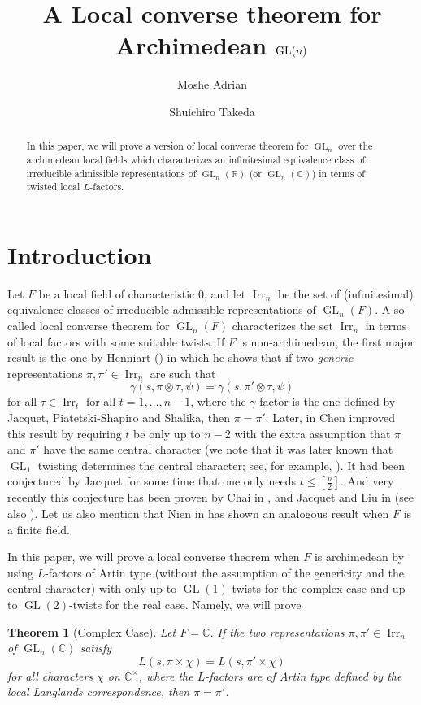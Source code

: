 \documentclass[11pt]{amsart}
\title[Archimedean local converse theorem]{A Local converse theorem
  for Archimedean $\GL(n)$}
\author{Moshe Adrian}
\author{Shuichiro Takeda}
\theoremstyle{plain}
\newtheorem*{Thm*}{Theorem}
\theoremstyle{definition}
\numberwithin{equation}{section}
\newcommand{\C}{\mathbb C}
\newcommand{\R}{\mathbb{R}}
\newcommand{\Irr}{\operatorname{Irr}}
\newcommand{\GL}{\operatorname{GL}}
\begin{document}
\maketitle

\begin{abstract} 
In this paper, we will prove a version of local
converse theorem for $\GL_n$ over the archimedean local fields which
characterizes an infinitesimal equivalence class of irreducible
admissible representations of $\GL_n(\R)$ (or $\GL_n(\C)$)
in terms of twisted local $L$-factors. 
\end{abstract}



\section{Introduction}


Let $F$ be a local field of characteristic 0, and let $\Irr_n$ be the set
of (infinitesimal) equivalence classes of irreducible admissible
representations of $\GL_n(F)$. A so-called local converse theorem for
$\GL_n(F)$ characterizes the set $\Irr_n$ in terms of local factors
with some suitable twists. If $F$ is
non-archimedean, the first major result is the one by Henniart
(\cite{Henniart1}) in which he shows that if two {\it generic}
representations $\pi, \pi'\in\Irr_n$ are such that
\[
\gamma(s, \pi\otimes\tau, \psi)=\gamma(s, \pi'\otimes\tau, \psi)
\]
for all $\tau\in\Irr_t$ for all $t=1,\dots,n-1$, where the
$\gamma$-factor is the one defined by Jacquet, Piatetski-Shapiro and
Shalika, then
$\pi=\pi'$. Later, in \cite{Chen} Chen improved this result by requiring
$t$ be only up to $n-2$ with the extra assumption that $\pi$ and
$\pi'$ have the same central character (we note that it was later known that $\GL_1$ twisting determines the central character; see, for example, \cite{JNS}). It had been conjectured by
Jacquet for some time that one only needs $t\leq[\frac{n}{2}]$. And very
recently this conjecture has been proven by Chai in \cite{Chai}, and Jacquet and Liu
in \cite{JL} (see also \cite{ALSX, JNS}). Let us also mention that Nien in \cite{Nien} has shown
an analogous result when $F$ is a finite field.

In this paper, we will prove a local converse theorem when $F$ is
archimedean by using $L$-factors of Artin type (without the
assumption of the genericity and the central character) with only up
to $\GL(1)$-twists for the complex case and up to $\GL(2)$-twists for the
real case. Namely, we will prove
\begin{Thm*}[Complex Case]
Let $F=\C$. If the two representations  $\pi, \pi'\in\Irr_n$ of
$\GL_n(\C)$ satisfy
\[
L(s, \pi\times\chi)=L(s, \pi'\times\chi)
\]
for all characters $\chi$ on $\C^\times$, where the $L$-factors are
of Artin type defined by the local Langlands correspondence, then $\pi=\pi'$. 
\end{Thm*}
\end{document}

